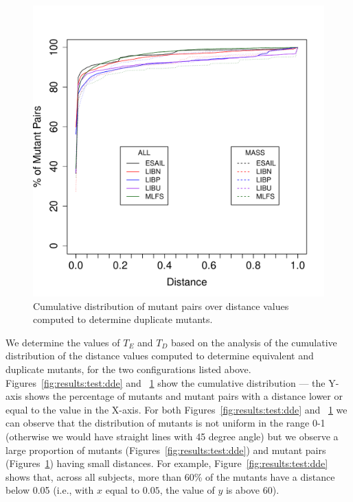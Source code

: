 \begin{figure}[tb]
\begin{center}
\includegraphics[width=\columnwidth]{data/distanceFequency_Redundant.pdf}
\caption{Cumulative distribution of mutant pairs over distance values computed to determine duplicate mutants.}
\label{fig:results:test:ddd}
\end{center}
\end{figure}



We determine the values of $T_E$ and $T_D$ based on the analysis of the 
cumulative distribution of the distance values computed to determine equivalent and duplicate mutants, for the two configurations listed above.
Figures~\ref{fig:results:test:dde} and
~\ref{fig:results:test:ddd}
show the cumulative distribution --- the Y-axis shows the percentage of mutants and mutant pairs with a distance lower or equal to the value in the X-axis.
For both Figures~\ref{fig:results:test:dde} and
~\ref{fig:results:test:ddd} we can observe that the distribution of mutants is not uniform in the range 0-1 (otherwise we would have straight lines with 45 degree angle) but we observe a large proportion of mutants (Figures~\ref{fig:results:test:dde}) and mutant pairs (Figures~\ref{fig:results:test:ddd}) having small distances. For example,
Figure~\ref{fig:results:test:dde} shows that, across all subjects, more than 60\% of the mutants have a distance below 0.05 (i.e., with $x$ equal to $0.05$, the value of $y$ is above $60$). 


